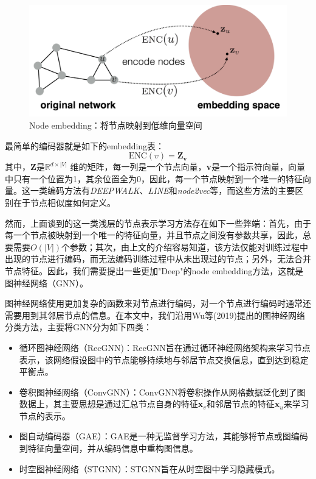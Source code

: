 \begin{figure}[!htbp]
  \centering
  \includegraphics[width=\textwidth]{Fig/nodeem.pdf}
  \caption{Node embedding：将节点映射到低维向量空间}
  \label{fig:nodeed}
\end{figure}

最简单的编码器就是如下的embedding表：
\[\text{ENC}(v) = \textbf{Z}_\textbf{v}\]
其中，$\textbf{Z}$是$\mathbb{R}^{d\times |V|}$ 维的矩阵，每一列是一个节点向量，\textbf{v}是一个指示符向量，向量中只有一个位置为1，其余位置全为0，因此，每一个节点映射到一个唯一的特征向量。这一类编码方法有\emph{DEEPWALK}\cite{perozzi2014deepwalk}、\emph{LINE}\cite{tang2015line}和\emph{node2vec}\cite{grover2016node2vec}等，而这些方法的主要区别在于节点相似度如何定义。

然而，上面谈到的这一类浅层的节点表示学习方法存在如下一些弊端：首先，由于每一个节点被映射到一个唯一的特征向量，并且节点之间没有参数共享，因此，总要需要$O(|V|)$个参数；其次，由上文的介绍容易知道，该方法仅能对训练过程中出现的节点进行编码，而无法编码训练过程中从未出现过的节点；另外，无法合并节点特征。因此，我们需要提出一些更加"Deep"的node embedding方法，这就是图神经网络（GNN）。

图神经网络使用更加复杂的函数来对节点进行编码，对一个节点进行编码时通常还需要用到其邻居节点的信息。在本文中，我们沿用Wu等(2019)\cite{wu2019comprehensive}提出的图神经网络分类方法，主要将GNN分为如下四类：
\begin{itemize}
  \item 循环图神经网络（RecGNN)：RecGNN旨在通过循环神经网络架构来学习节点表示，该网络假设图中的节点能够持续地与邻居节点交换信息，直到达到稳定平衡点。
\item 卷积图神经网络（ConvGNN）：ConvGNN将卷积操作从网格数据泛化到了图数据上，其主要思想是通过汇总节点自身的特征\textbf{x}$_v$和邻居节点的特征\textbf{x}$_u$来学习节点的表示。
  \item 图自动编码器（GAE）：GAE是一种无监督学习方法，其能够将节点或图编码到特征向量空间，并从编码信息中重构图信息。
	\item 时空图神经网络（STGNN）：STGNN旨在从时空图中学习隐藏模式。
\end{itemize}

